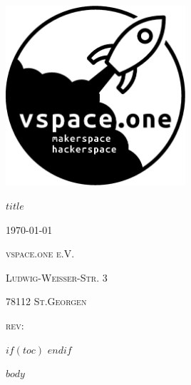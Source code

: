 \documentclass[parskip=full,12pt,a4paper]{article}
\begin{document}
\begin{titlepage}
	\centering
	\includegraphics[width=0.5\textwidth]{pics/logo.eps}\par\vspace{1cm}
  {\scshape\Huge $title$ \par}
	\vfill

	{\scshape\large \today\par}
	{\scshape\large vspace.one e.V. \par}
	{\scshape\large Ludwig-Weißer-Str. 3 \par}
	{\scshape\large 78112 St.Georgen \par}
	{\scshape\large rev: \GITAbrHash \par}
	\vspace{1cm}
\end{titlepage}

$if(toc)$
{
\tableofcontents
\clearpage
}
$endif$


$body$
\end{document}
